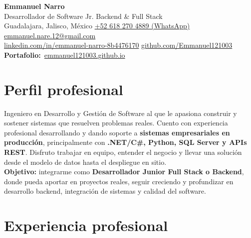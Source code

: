\documentclass[11pt,a4paper]{article}
\begin{document}
\begin{center}
  {\color{ink}\Huge\bfseries Emmanuel Narro}\\[5pt]
  {\large\color{accent} Desarrollador de Software Jr. \textbar{} Backend \& Full Stack}\\[7pt]
  {\color{muted}\small
   Guadalajara, Jalisco, México \enspace\textbullet\enspace
   \href{https://wa.me/526182704889}{+52 618 270 4889 (WhatsApp)} \enspace\textbullet\enspace
   \href{mailto:emmanuel.nare.12@gmail.com}{emmanuel.nare.12@gmail.com}\\[3pt]
   \href{https://www.linkedin.com/in/emmanuel-narro-8b4476170}{linkedin.com/in/emmanuel-narro-8b4476170}
   \enspace\textbullet\enspace
   \href{https://github.com/Emmanuel121003}{github.com/Emmanuel121003}
   \enspace\textbullet\enspace
   {\color{accent}\textbf{Portafolio:}}~\href{https://emmanuel121003.github.io/}{emmanuel121003.github.io}}
\end{center}

\section{Perfil profesional}
Ingeniero en Desarrollo y Gestión de Software al que le apasiona construir y sostener sistemas que resuelven problemas
reales. Cuento con experiencia profesional desarrollando y dando soporte a \textbf{sistemas empresariales en producción},
principalmente con \textbf{.NET/C\#, Python, SQL Server y APIs REST}. Disfruto trabajar en equipo, entender el negocio y
llevar una solución desde el modelo de datos hasta el despliegue en sitio.
\\[3pt]
\textbf{Objetivo:} integrarme como \textbf{Desarrollador Junior Full Stack o Backend}, donde pueda aportar en proyectos
reales, seguir creciendo y profundizar en desarrollo backend, integración de sistemas y calidad del software.

\section{Experiencia profesional}
\end{document}
